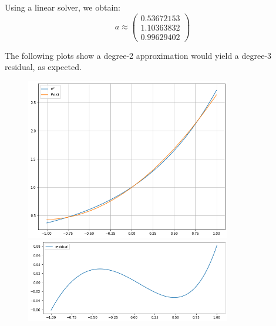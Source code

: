 \documentclass[12pt]{article} %
\newcommand{\1}[1]{\mathds{1}\left[#1\right]}
\begin{document}
Using a linear solver, we obtain:
$$
	a \approx \begin{pmatrix}0.53672153\\ 1.10363832\\ 0.99629402\end{pmatrix}
$$

The following plots show a degree-2 approximation would yield a degree-3 residual, as expected.
\begin{figure}[h]
\centering
\includegraphics[width=0.8\textwidth]{p1poly2.png}
\includegraphics[width=0.8\textwidth]{p1poly2_res.png}
\end{figure}
\end{document}

